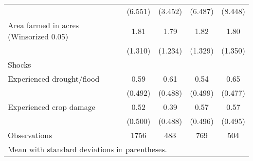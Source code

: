 {\begin{tabular}{l*{4}{c}}
                    &     (6.551)         &     (3.452)         &     (6.487)         &     (8.448)         \\
[1em]
Area farmed in acres (Winsorized 0.05)&        1.81         &        1.79         &        1.82         &        1.80         \\
                    &     (1.310)         &     (1.234)         &     (1.329)         &     (1.350)         \\
[1em]
Shocks              &                     &                     &                     &                     \\
[1em]
Experienced drought/flood&        0.59         &        0.61         &        0.54         &        0.65         \\
                    &     (0.492)         &     (0.488)         &     (0.499)         &     (0.477)         \\
[1em]
Experienced crop damage&        0.52         &        0.39         &        0.57         &        0.57         \\
                    &     (0.500)         &     (0.488)         &     (0.496)         &     (0.495)         \\
\hline
Observations        &        1756         &         483         &         769         &         504         \\
\hline\hline
\multicolumn{5}{l}{\footnotesize Mean with standard deviations in parentheses.}\\
\end{tabular}
}

